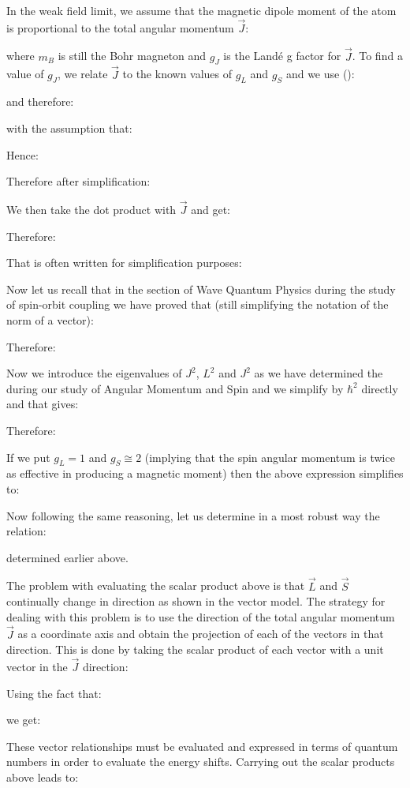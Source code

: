 	In the weak field limit, we assume that the magnetic dipole moment of the atom is proportional to the total angular momentum $\vec{J}$:
	
	where $m_B$ is still the Bohr magneton and $g_J$ is the Landé g factor for $\vec{J}$. To find a value of $g_J$, we relate $\vec{J}$ to the known values of $g_L$ and $g_S$ and we use ():
	
	and therefore:
	
	with the assumption that:
	
	Hence:
	
	Therefore after simplification:
	
	We then take the dot product with $\vec{J}$ and get:
	
	Therefore:
	
	That is often written for simplification purposes:
	
	Now let us recall that in the section of Wave Quantum Physics during the study of spin-orbit coupling we have proved that (still simplifying the notation of the norm of a vector):
	
	Therefore:
	
	Now we introduce the eigenvalues of $J^2$, $L^2$ and $J^2$ as we have determined the during our study of Angular Momentum and Spin and we simplify by $\hbar^2$ directly and that gives:
	
	Therefore:
	
	If we put $g_L=1$ and $g_S\cong 2$ (implying that the spin angular momentum is twice as effective in producing a magnetic moment) then the above expression simplifies to:
	
	Now following the same reasoning, let us determine in a most robust way the relation:
	
	determined earlier above.
	
	The problem with evaluating the scalar product above is that $\vec{L}$ and $\vec{S}$ continually change in direction as shown in the vector model. The strategy for dealing with this problem is to use the direction of the total angular momentum $\vec{J}$ as a coordinate axis and obtain the projection of each of the vectors in that direction. This is done by taking the scalar product of each vector with a unit vector in the $\vec{J}$ direction:
	
	Using the fact that:
	
	we get:
	
	These vector relationships must be evaluated and expressed in terms of quantum numbers in order to evaluate the energy shifts. Carrying out the scalar products above leads to:
	

